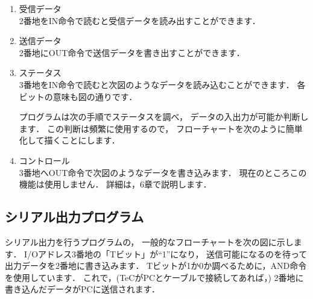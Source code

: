 \begin{enumerate}
\item 受信データ \\
2番地をIN命令で読むと受信データを読み出すことができます．

\item 送信データ \\
2番地にOUT命令で送信データを書き出すことができます．

\item ステータス \\
3番地をIN命令で読むと次図のようなデータを読み込むことができます．
各ビットの意味も図の通りです．

\begin{center}
\epsfxsize=4.7cm
\end{center}

プログラムは次の手順でステータスを調べ，
データの入出力が可能か判断します．
この判断は頻繁に使用するので，
フローチャートを次のように簡単化して描くことにします．

\begin{center}
\epsfxsize=6.8cm
\end{center}

\item コントロール \\
3番地へOUT命令で次図のようなデータを書き込みます．
現在のところこの機能は使用しません．
詳細は，6章で説明します．

\begin{center}
\epsfxsize=5cm
\end{center}

\end{enumerate}

\newpage
\subsection{シリアル出力プログラム}
シリアル出力を行うプログラムの，
一般的なフローチャートを次の図に示します．
I/Oアドレス3番地の「Tビット」が``1''になり，
送信可能になるのを待って出力データを2番地に書き込みます．
Tビットが1か0か調べるために，AND命令を使用しています．
これで，(TeCがPCとケーブルで接続してあれば，)
2番地に書き込んだデータがPCに送信されます．

\begin{center}
\epsfxsize=7cm
\end{center}

